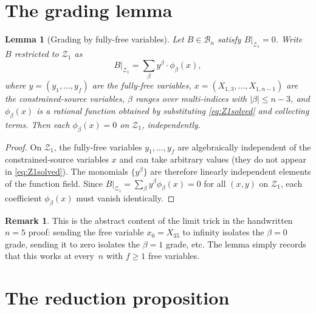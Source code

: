 \documentclass[11pt]{article}
\theoremstyle{plain}
\newtheorem{lemma}[theorem]{Lemma}
\theoremstyle{definition}
\newtheorem{remark}[theorem]{Remark}
\newcommand{\cB}{\mathcal{B}}
\newcommand{\cZ}{\mathcal{Z}}
\begin{document}
\section{The grading lemma}

\begin{lemma}[Grading by fully-free variables]\label{lem:grading}
Let $B\in\cB_n$ satisfy $B|_{\cZ_1} = 0$. Write $B$ restricted to
$\cZ_1$ as
\[
B\big|_{\cZ_1} = \sum_{\beta} y^\beta \cdot \phi_\beta(x),
\]
where $y = (y_1,\ldots,y_f)$ are the fully-free variables,
$x = (X_{1,3},\ldots,X_{1,n-1})$ are the constrained-source variables,
$\beta$ ranges over multi-indices with $|\beta|\leq n{-}3$, and
$\phi_\beta(x)$ is a rational function obtained by substituting
\eqref{eq:Z1solved} and collecting terms. Then each
$\phi_\beta(x) = 0$ on $\cZ_1$, independently.
\end{lemma}

\begin{proof}
On $\cZ_1$, the fully-free variables $y_1,\ldots,y_f$ are
algebraically independent of the constrained-source variables $x$
and can take arbitrary values (they do not appear in
\eqref{eq:Z1solved}). The monomials $\{y^\beta\}$ are therefore
linearly independent elements of the function field. Since
$B|_{\cZ_1} = \sum_\beta y^\beta \phi_\beta(x) = 0$ for all $(x,y)$
on $\cZ_1$, each coefficient $\phi_\beta(x)$ must vanish identically.
\end{proof}

\begin{remark}
This is the abstract content of the limit trick in the handwritten
$n=5$ proof: sending the free variable $x_0=X_{35}$ to infinity
isolates the $\beta=0$ grade, sending it to zero isolates the
$\beta=1$ grade, etc. The lemma simply records that this works at
every~$n$ with $f\geq 1$ free variables.
\end{remark}

\section{The reduction proposition}
\end{document}
